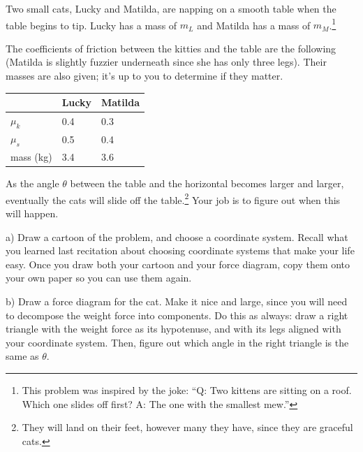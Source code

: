 \documentclass[12pt]{article}
\newcommand{\BS}{\bigskip}
\begin{document}
\newpage


Two small cats, Lucky and Matilda, are napping on a smooth table when the table begins to tip. Lucky has a mass of $m_L$ and Matilda has a mass of $m_M$.\footnote{This problem was inspired by the joke: ``Q: Two kittens are sitting on a roof. Which one slides off first? A: The one with the smallest mew.''}

\begin{minipage}{0.6\textwidth}
The coefficients of friction between the kitties and the table are the following (Matilda is slightly fuzzier underneath since she has only three legs). Their masses are also
given; it's up to you to determine if they matter.
\end{minipage}\hspace{0.1\textwidth}
\begin{minipage}{0.3\textwidth}
\begin{tabular}{|l|l|l|}
\hline
        & Lucky & Matilda \\ \hline
$\mu_k$ & 0.4  & 0.3  \\ \hline
$\mu_s$ & 0.5  & 0.4  \\ \hline
mass (kg) & 3.4 & 3.6 \\ \hline
\end{tabular}
\end{minipage}

As the angle $\theta$ between the table and the horizontal becomes larger and larger, eventually the cats will slide off the 
table.\footnote{They will land on their feet, however many they have, since they are graceful cats.} Your job is to figure out when this will happen.
\BS

\begin{minipage}{0.45\textwidth}
a) Draw a cartoon of the problem, and choose a coordinate system. Recall what you learned last recitation about choosing
coordinate systems that make your life easy. Once you draw both your cartoon and your force diagram, copy them onto your own paper so you can use them again.
\end{minipage}
\hspace{0.1\textwidth}
\begin{minipage}{0.45\textwidth}
b) Draw a force diagram for the cat. Make it nice and large, since you will need to decompose the weight force into components. Do this as always: draw a right triangle with the weight force as its 
hypotenuse, and with its legs aligned with your coordinate system. Then, figure out which angle in the right triangle
is the same as $\theta$.
\end{minipage}
\vspace{3in}
\newpage
\end{document}
